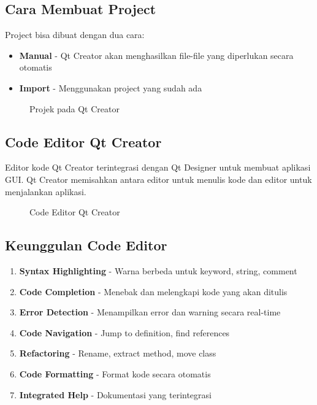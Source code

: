 \subsection{Cara Membuat Project}

Project bisa dibuat dengan dua cara:
\begin{itemize}
\item \textbf{Manual} - Qt Creator akan menghasilkan file-file yang diperlukan secara otomatis
\item \textbf{Import} - Menggunakan project yang sudah ada
\end{itemize}

\begin{figure}[htbp]
\centering 
{}
\caption{Projek pada Qt Creator}
\label{fig:projek-pada-qt-creator}
\end{figure}

\subsection{Code Editor Qt Creator}

Editor kode Qt Creator terintegrasi dengan Qt Designer untuk membuat aplikasi GUI. Qt Creator memisahkan antara editor untuk menulis kode dan editor untuk menjalankan aplikasi.

\begin{figure}[htbp]
\centering
{}
\label{fig:code-editor}
\caption{Code Editor Qt Creator}
\end{figure}

\subsection{Keunggulan Code Editor}

\begin{enumerate}
\item \textbf{Syntax Highlighting} - Warna berbeda untuk keyword, string, comment
\item \textbf{Code Completion} - Menebak dan melengkapi kode yang akan ditulis
\item \textbf{Error Detection} - Menampilkan error dan warning secara real-time
\item \textbf{Code Navigation} - Jump to definition, find references
\item \textbf{Refactoring} - Rename, extract method, move class
\item \textbf{Code Formatting} - Format kode secara otomatis
\item \textbf{Integrated Help} - Dokumentasi yang terintegrasi
\end{enumerate}

